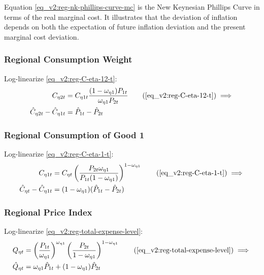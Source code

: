 \documentclass[../thesis.tex]{subfiles}
\begin{document}
Equation \ref{eq_v2:reg-nk-phillips-curve-mc} is the New Keynesian Phillips Curve in terms of the real marginal cost. It illustrates that the deviation of inflation depends on both the expectation of future inflation deviation and the present marginal cost deviation.


\subsubsection*{Regional Consumption Weight}

Log-linearize \ref{eq_v2:reg-C-eta-12-t}:
\begin{align}
	C_{\eta 2 t} &= C_{\eta 1 t} \frac{(1 - \omega_{\eta 1}) P_{1t}}{\omega_{\eta 1} P_{2t}} \tag{\ref{eq_v2:reg-C-eta-12-t}} \implies \\
	\hat{C}_{\eta 2t} - \hat{C}_{\eta 1t} &= \hat{P}_{1t} - \hat{P}_{2t} \label{eq_v2:reg-C-eta-12-t-ll}
\end{align}

\subsubsection*{Regional Consumption of Good 1}

Log-linearize \ref{eq_v2:reg-C-eta-1-t}:
\begin{align}
	C_{\eta 1 t} &= C_{\eta t} \left( \frac{P_{2t} \omega_{\eta 1}}{P_{1t} (1 - \omega_{\eta 1})} \right)^{1-\omega_{\eta 1}} \tag{\ref{eq_v2:reg-C-eta-1-t}} \implies \\
	\hat{C}_{\eta t} - \hat{C}_{\eta 1 t} &= (1 - \omega_{\eta 1}) (\hat{P}_{1t} - \hat{P}_{2t}) \label{eq_v2:reg-C-eta-1-t-ll}
\end{align}


\subsubsection*{Regional Price Index}

Log-linearize \ref{eq_v2:reg-total-expense-level}:
\begin{align}
	Q_{\eta t} &= \left( \frac{P_{1 t}}{\omega_{\eta 1}} \right)^{\omega_{\eta 1}} \left( \frac{P_{2 t}}{1 -\omega_{\eta 1}} \right)^{1 -\omega_{\eta 1}} \tag{\ref{eq_v2:reg-total-expense-level}} \implies \\
	\hat{Q}_{\eta t} &= \omega_{\eta 1} \hat{P}_{1 t} + (1 -\omega_{\eta 1}) \hat{P}_{2 t} \label{eq_v2:reg-total-expense-level-ll}
\end{align}
\end{document}
